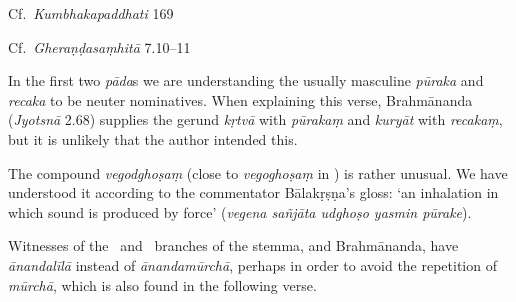 \begin{ekdosis}
\begin{testimonia}[hp02_069]
Cf.~\emph{Kumbhakapaddhati} 169

\begin{versinnote}
\end{versinnote}

Cf.~\emph{Gheraṇḍasaṃhitā} 7.10--11

\begin{versinnote}
\end{versinnote}
\end{testimonia}

\begin{philcomm}[hp02_069]
In the first two \emph{pāda}s we are understanding the usually masculine \emph{pūraka} and \emph{recaka} to be neuter nominatives. When explaining this verse, Brahmānanda (\emph{Jyotsnā} 2.68) supplies the gerund \emph{kṛtvā} with \emph{pūrakaṃ} and \emph{kuryāt} with \emph{recakaṃ}, but it is unlikely that the author intended this. \lb

The compound \emph{vegodghoṣaṃ} (close to \emph{vegoghoṣaṃ} in \alphaOne) is rather unusual. We have understood it according to the commentator Bālakṛṣṇa’s gloss: `an inhalation in which sound is produced by force' (\emph{vegena sañjāta udghoṣo yasmin pūrake}).\lb

Witnesses of the \textgamma \ and \textdelta \ branches of the stemma, and Brahmānanda, have \emph{ānandalīlā} instead of \emph{ānandamūrchā}, perhaps in order to avoid the repetition of \emph{mūrchā}, which is also found in the following verse.

\end{philcomm}


\end{ekdosis}
